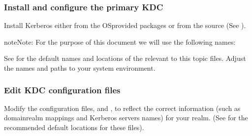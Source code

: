 \documentclass[letterpaper,10pt,english]{sphinxmanual}
\begin{document}
\subsubsection{Install and configure the primary KDC}
\label{\detokenize{admin/install_kdc:install-and-configure-the-primary-kdc}}
\sphinxAtStartPar
Install Kerberos either from the OS\sphinxhyphen{}provided packages or from the
source (See ).

\begin{sphinxadmonition}{note}{Note:}
\sphinxAtStartPar
For the purpose of this document we will use the following
names:

\begin{sphinxVerbatim}[commandchars=\\\{\}]
      
    
        
    
           
\end{sphinxVerbatim}

\sphinxAtStartPar
See {\hyperref[\detokenize{mitK5defaults:mitk5defaults}]{}} for the default names and locations
of the relevant to this topic files.  Adjust the names and
paths to your system environment.
\end{sphinxadmonition}


\subsubsection{Edit KDC configuration files}
\label{\detokenize{admin/install_kdc:edit-kdc-configuration-files}}
\sphinxAtStartPar
Modify the configuration files, {\hyperref[\detokenize{admin/conf_files/krb5_conf:krb5-conf-5}]{}} and
{\hyperref[\detokenize{admin/conf_files/kdc_conf:kdc-conf-5}]{}}, to reflect the correct information (such as
domain\sphinxhyphen{}realm mappings and Kerberos servers names) for your realm.
(See {\hyperref[\detokenize{mitK5defaults:mitk5defaults}]{}} for the recommended default locations for
these files).
\end{document}
